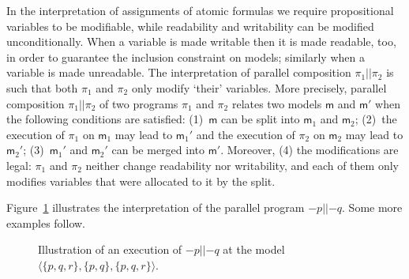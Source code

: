 \documentclass{llncs}
\newcommand{\modl}{\mathsf m}
\newcommand{\pll}{ {||} }							%
\newcommand{\assgnbotV}[1]{{\mathtt {-} #1}}
\newcommand{\set}[1]{\{#1\}}
\newcommand{\tuple}[1]{ \langle #1 \rangle}
\begin{document}
In the interpretation of assignments of atomic formulas we require 
propositional variables to be modifiable, while 
readability and writability can be modified unconditionally.
When a variable is made writable then it is made readable, too, 
in order to guarantee the inclusion constraint on models; 
similarly when a variable is made unreadable. 
%
The interpretation of parallel composition $\pi_1 \pll \pi_2$ is such that both $\pi_1$ and $\pi_2$ only modify `their' variables. 
More precisely, parallel composition $\pi_1 \pll \pi_2$ of two programs $\pi_1$ and $\pi_2$ 
relates two models $\modl$ and $\modl'$ when the following conditions are satisfied:
(1)~$\modl$ can be split into $\modl_1$ and $\modl_2$; 
(2)~the execution of $\pi_1$ on $\modl_1$ may lead to $\modl_1'$ and 
    the execution of $\pi_2$ on $\modl_2$ may lead to $\modl_2'$;
(3)~$\modl_1'$ and $\modl_2'$ can be merged into $\modl'$. 
Moreover, 
(4) the modifications are legal: $\pi_1$ and $\pi_2$ neither change readability nor writability, and 
each of them only modifies variables that were allocated to it by the split. 

Figure~\ref{fig:ex:parallel} illustrates the interpretation of the parallel program $\assgnbotV p \pll \assgnbotV q$. 
Some more examples follow. 

\begin{figure}[t]
  \centering
  
\caption{Illustration of an execution of $\assgnbotV p \pll \assgnbotV q$ at the model $\tuple{ \set{p,q,r} , \set{p,q} , \set{p,q,r} } $. 
}
\label{fig:ex:parallel} 
\end{figure}
\end{document}
